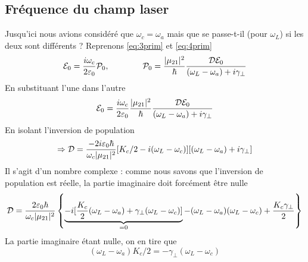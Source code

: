 \subsection{Fréquence du champ laser}
Jusqu'ici nous avions considéré que $\omega_c=\omega_a$ mais que se passe-t-il (pour $\omega_L$) 
si les deux sont différents ? Reprenons \eqref{eq:3prim} et \eqref{eq:4prim}
\begin{equation}
[{K_c}/2 - i({\omega _L} - {\omega _c})]{{\cal E}_0} = \frac{{i{\omega _c}}}{{2{\varepsilon _0}}}{{\cal P}_0},\qquad\qquad
{{\cal P}_0} = \frac{{|{\mu _{21}}{|^2}}}{\hbar }\frac{{{\cal D}{{\cal E}_0}}}{{({\omega _L} - {\omega _a}) + i{\gamma _ \bot }}}
\end{equation}
En substituant l'une dans l'autre
\begin{equation}
[{K_c}/2 - i({\omega _L} - {\omega _c})]{{\cal E}_0} = \frac{{i{\omega _c}}}{{2{\varepsilon _0}}}\frac{{|{\mu _{21}}{|^2}}}{\hbar }\frac{{{\cal D}{{\cal E}_0}}}{{({\omega _L} - {\omega _a}) + i{\gamma _ \bot }}}
\end{equation}
En isolant l'inversion de population
\begin{equation}
\Rightarrow {\cal D} = \frac{{ - 2i{\varepsilon _0}\hbar }}{{{\omega _c}|{\mu _{21}}{|^2}}}[{K_c}/2 - i({\omega _L} - {\omega _c})][({\omega _L} - {\omega _a}) + i{\gamma _ \bot }]
\end{equation}
Il s'agit d'un nombre complexe : comme nous savons que l'inversion de population est réelle, la 
partie imaginaire doit forcément être nulle
\begin{equation}
{\cal D} = \frac{{2{\varepsilon _0}\hbar }}{{{\omega _c}|{\mu _{21}}{|^2}}}\left\{ {\underbrace{- i[\frac{{{K_c}}}{2}({\omega _L} - {\omega _a}) + {\gamma _ \bot }({\omega _L} - {\omega _c})]}_{=0} - ({\omega _L} - {\omega _a})({\omega _L} - {\omega _c}) + \frac{{{K_c}{\gamma _ \bot }}}{2}} \right\}
\label{eq:ch3.7}
\end{equation}
La partie imaginaire étant nulle, on en tire que
\begin{equation}
({\omega _L} - {\omega _a}){K_c}/2 =  - {\gamma _ \bot }({\omega _L} - {\omega _c})
\end{equation}

